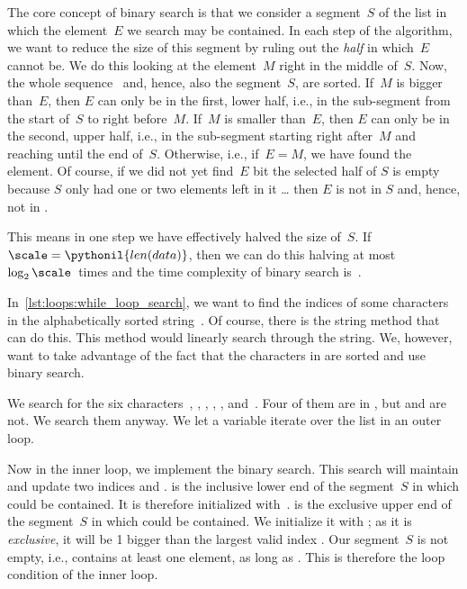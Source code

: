 The core concept of binary search is that we consider a segment~$S$ of the list in which the element~$E$ we search may be contained.
In each step of the algorithm, we want to reduce the size of this segment by ruling out the \emph{half} in which~$E$ cannot be.
We do this looking at the element~$M$ right in the middle of~$S$.
Now, the whole sequence~ and, hence, also the segment~$S$, are sorted.
If~$M$ is bigger than~$E$, then $E$ can only be in the first, lower half, i.e., in the sub-segment from the start of~$S$ to right before~$M$.
If~$M$ is smaller than~$E$, then $E$ can only be in the second, upper half, i.e., in the sub-segment starting right after~$M$ and reaching until the end of~$S$.
Otherwise, i.e., if~$E=M$, we have found the element.
Of course, if we did not yet find~$E$ bit the selected half of $S$ is empty because $S$ only had one or two elements left in it {\dots} then $E$ is not in $S$ and, hence, not in .

This means in one step we have effectively halved the size of~$S$.
If~$\scale=\pythonil{len(data)}$, then we can do this halving at most $\log_2 \scale$~times and the time complexity of binary search is~\bigOb{\log{\scale}}.%
%
\begin{sloppypar}%
In~\cref{lst:loops:while_loop_search}, we want to find the indices of some characters in the alphabetically sorted string~.
Of course, there is the string method  that can do this.
This method would linearly search through the string.
We, however, want to take advantage of the fact that the characters in  are sorted and use binary search.%
\end{sloppypar}%
%
We search for the six characters~, , , , , and~.
Four of them are in , but  and  are not.
We search them anyway.
We let a variable  iterate over the list \pythonil{["a", "c", "o", "p", "w", "z"]} in an outer loop.

Now in the inner loop, we implement the binary search.
This search will maintain and update two indices  and .
 is the inclusive lower end of the segment~$S$ in which  could be contained.
It is therefore initialized with~.
 is the exclusive upper end of the segment~$S$ in which  could be contained.
We initialize it with ; as it is \emph{exclusive}, it will be 1 bigger than the largest valid index .
Our segment~$S$ is not empty, i.e., contains at least one element, as long as .
This is therefore the loop condition of the inner loop.

